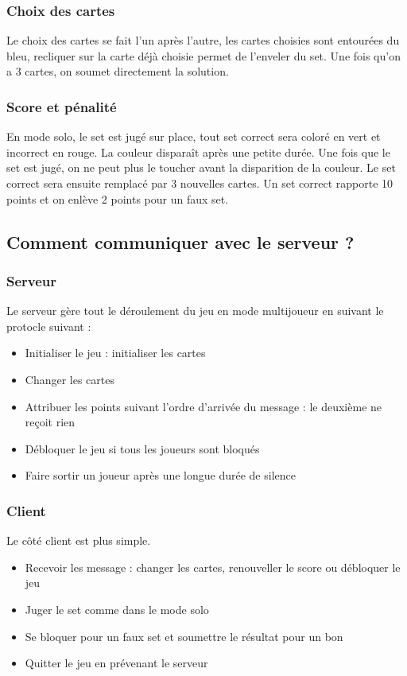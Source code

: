 \documentclass[paper=a4, french]{scrartcl} %
\begin{document}
\subsubsection{Choix des cartes}
Le choix des cartes se fait l'un après l'autre, les cartes choisies sont entourées du bleu, recliquer sur la carte déjà choisie permet de l'enveler du set. Une fois qu'on a 3 cartes, on soumet directement la solution.

\subsubsection{Score et pénalité}
En mode solo, le set est jugé sur place, tout set correct sera coloré en vert et incorrect en rouge. La couleur disparaît après une petite durée. Une fois que le set est jugé, on ne peut plus le toucher avant la disparition de la couleur. Le set correct sera ensuite remplacé par 3 nouvelles cartes. Un set correct rapporte 10 points et on enlève 2 points pour un faux set.
 
 
\subsection{Comment communiquer avec le serveur ?}

\subsubsection{Serveur}
Le serveur gère tout le déroulement du jeu en mode multijoueur en suivant le protocle suivant : 
\begin{itemize}
\item Initialiser le jeu : initialiser les cartes
\item Changer les cartes 
\item Attribuer les points suivant l'ordre d'arrivée du message : le deuxième ne reçoit rien
\item Débloquer le jeu si tous les joueurs sont bloqués
\item Faire sortir un joueur après une longue durée de silence
\end{itemize}
	
\subsubsection{Client}
Le côté client est plus simple. 
\begin{itemize}
\item Recevoir les message : changer les cartes, renouveller le score ou débloquer le jeu
\item Juger le set comme dans le mode solo
\item Se bloquer pour un faux set et soumettre le résultat pour un bon
\item Quitter le jeu en prévenant le serveur
\end{itemize}
\end{document}
